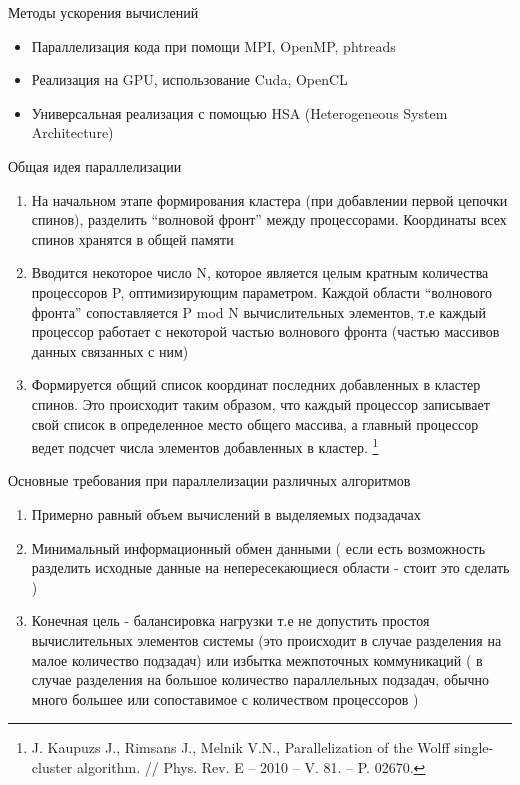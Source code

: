 \documentclass{beamer}
\begin{document}
\begin{frame}{Методы ускорения вычислений}
	\begin{itemize}
	  \item Параллелизация кода при помощи MPI, OpenMP, phtreads
	  \item Реализация на GPU\footnotemark[4], использование
	  Cuda, OpenCL
	  \item Универсальная реализация с помощью HSA (Heterogeneous System
	  Architecture)
	\end{itemize}
\end{frame}

\begin{frame}{Общая идея параллелизации}
	\begin{enumerate}
	  \item На начальном этапе формирования кластера (при добавлении первой цепочки
	  спинов), разделить ``волновой фронт'' между процессорами. Координаты всех
	  спинов хранятся в общей памяти
	  \item Вводится некоторое число N, которое является целым кратным количества
	  процессоров P, оптимизирующим параметром. Каждой
	  области ``волнового фронта'' сопоставляется P mod N вычислительных элементов,
	  т.е каждый процессор работает с некоторой частью волнового фронта (частью
	  массивов данных связанных с ним)
	  \item Формируется общий список координат последних добавленных в кластер
	  спинов. Это происходит таким образом, что каждый процессор
	  записывает свой список в определенное место общего массива, а главный
	  процессор ведет подсчет числа элементов добавленных в кластер.
	  \footnote[4]{J.
	  Kaupuzs J., Rimsans J., Melnik V.N., Parallelization of the Wolff
single-cluster algorithm. // Phys. Rev. E -- 2010 -- V. 81. -- P. 02670.}
	\end{enumerate}
\end{frame}

\begin{frame}{Основные требования при параллелизации различных алгоритмов}
	\begin{enumerate}
	  \item Примерно равный объем вычислений в выделяемых подзадачах
	  \item Минимальный информационный обмен данными ( если есть возможность
	  разделить исходные данные на непересекающиеся области - стоит это сделать )
	  \item Конечная цель - балансировка нагрузки т.е не допустить простоя
	  вычислительных элементов системы (это происходит в случае разделения на малое
	  количество подзадач) или избытка межпоточных коммуникаций ( в случае
	  разделения на большое количество параллельных подзадач, обычно много большее
	  или сопоставимое с количеством процессоров )
	\end{enumerate}
\end{frame}
\end{document}

